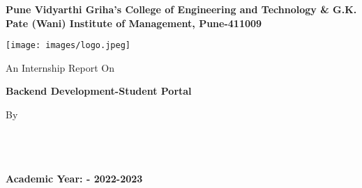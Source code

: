 \documentclass[12pt]{article}
\begin{document}


\noindent 

\noindent 

\noindent 

\noindent  

\noindent 

\noindent  

\noindent 

\noindent

\noindent  

\noindent 

\begin{center}
{\fontsize{21}{20}\selectfont \textbf{Pune Vidyarthi Griha's College of Engineering and Technology \& G.K. Pate (Wani) Institute of Management, Pune-411009}}


\vspace{0.5cm}


\noindent \texttt{[image: images/logo.jpeg]} 



\noindent An Internship Report On 
\vspace{0.3cm}

{\Large\textbf
{Backend Development-Student Portal}}

\vspace{0.1cm}

\bigskip
\noindent By\\
\bigskip

{\fontsize{16}{20}}
\vspace{0.5cm}
\bigskip

{\fontsize{13}{20}\selectfont{Under the Guidance of}}\\
\medskip
{}\\
\bigskip
\bigskip
\vspace{0.5cm}
\\

\noindent \textbf{Academic Year: - 2022-2023 }
\end{center}
\pagebreak
\end{document}
